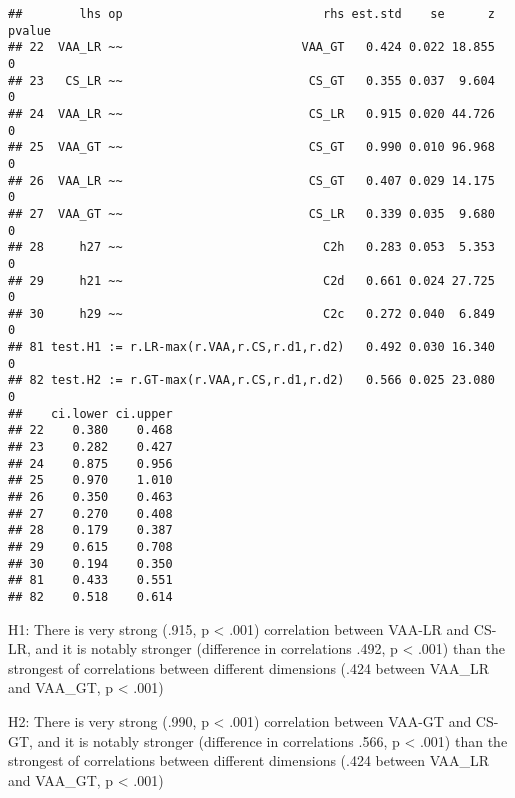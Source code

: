 \documentclass[
]{article}
\newenvironment{Shaded}{\begin{snugshade}}{\end{snugshade}}
\newcommand{\CommentTok}[1]{\textcolor[rgb]{0.56,0.35,0.01}{\textit{#1}}}
\newcommand{\DecValTok}[1]{\textcolor[rgb]{0.00,0.00,0.81}{#1}}
\newcommand{\KeywordTok}[1]{\textcolor[rgb]{0.13,0.29,0.53}{\textbf{#1}}}
\newcommand{\NormalTok}[1]{#1}
\newcommand{\OperatorTok}[1]{\textcolor[rgb]{0.81,0.36,0.00}{\textbf{#1}}}
\newcommand{\StringTok}[1]{\textcolor[rgb]{0.31,0.60,0.02}{#1}}
\begin{document}
\begin{verbatim}
##        lhs op                            rhs est.std    se      z pvalue
## 22  VAA_LR ~~                         VAA_GT   0.424 0.022 18.855      0
## 23   CS_LR ~~                          CS_GT   0.355 0.037  9.604      0
## 24  VAA_LR ~~                          CS_LR   0.915 0.020 44.726      0
## 25  VAA_GT ~~                          CS_GT   0.990 0.010 96.968      0
## 26  VAA_LR ~~                          CS_GT   0.407 0.029 14.175      0
## 27  VAA_GT ~~                          CS_LR   0.339 0.035  9.680      0
## 28     h27 ~~                            C2h   0.283 0.053  5.353      0
## 29     h21 ~~                            C2d   0.661 0.024 27.725      0
## 30     h29 ~~                            C2c   0.272 0.040  6.849      0
## 81 test.H1 := r.LR-max(r.VAA,r.CS,r.d1,r.d2)   0.492 0.030 16.340      0
## 82 test.H2 := r.GT-max(r.VAA,r.CS,r.d1,r.d2)   0.566 0.025 23.080      0
##    ci.lower ci.upper
## 22    0.380    0.468
## 23    0.282    0.427
## 24    0.875    0.956
## 25    0.970    1.010
## 26    0.350    0.463
## 27    0.270    0.408
## 28    0.179    0.387
## 29    0.615    0.708
## 30    0.194    0.350
## 81    0.433    0.551
## 82    0.518    0.614
\end{verbatim}

\begin{Shaded}
\end{Shaded}

H1: There is very strong (.915, p \textless{} .001) correlation between
VAA-LR and CS-LR, and it is notably stronger (difference in correlations
.492, p \textless{} .001) than the strongest of correlations between
different dimensions (.424 between VAA\_LR and VAA\_GT, p \textless{}
.001)

H2: There is very strong (.990, p \textless{} .001) correlation between
VAA-GT and CS-GT, and it is notably stronger (difference in correlations
.566, p \textless{} .001) than the strongest of correlations between
different dimensions (.424 between VAA\_LR and VAA\_GT, p \textless{}
.001)
\end{document}
